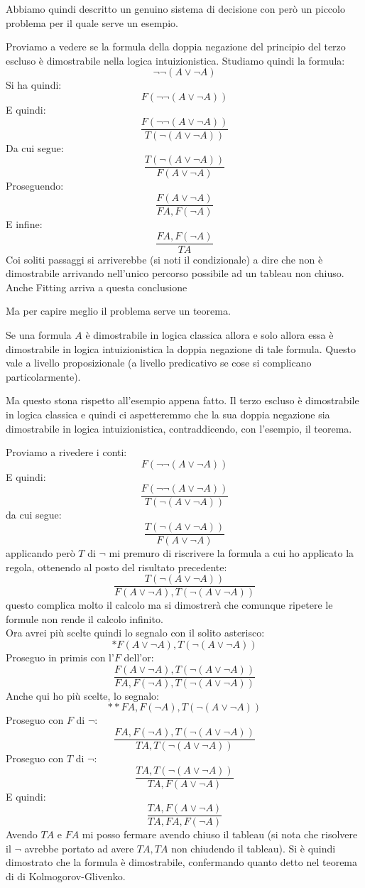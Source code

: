 \documentclass[a4paper,12pt, oneside]{book}
\begin{document}
Abbiamo quindi descritto un genuino sistema di decisione con però un piccolo
problema per il quale serve un esempio. 
\begin{esempio}
  Proviamo a vedere se la formula della doppia negazione del principio del terzo
  escluso è dimostrabile nella logica intuizionistica. Studiamo quindi la
  formula: 
  \[\neg\neg(A\lor \neg A)\]
  Si ha quindi:
  \[F(\neg\neg(A\lor \neg A))\]
  E quindi:
  \[\frac{F(\neg\neg(A\lor \neg A))}{T(\neg (A\lor \neg A))}\]
  Da cui segue:
  \[\frac{T(\neg (A\lor \neg A))}{F(A\lor \neg A)}\]
  Proseguendo:
  \[\frac{F(A\lor \neg A)}{FA, F(\neg A)}\]
  E infine:
  \[\frac{FA, F(\neg A)}{TA}\]
  Coi soliti passaggi si arriverebbe (si noti il condizionale) a dire che non è
  dimostrabile arrivando nell'unico percorso possibile ad un tableau non
  chiuso. \\
  Anche Fitting arriva a questa conclusione
\end{esempio}
Ma per capire meglio il problema serve un teorema.
\begin{teorema}
  Se una formula $A$ è dimostrabile in logica classica allora e solo allora essa
  è dimostrabile in logica intuizionistica la doppia negazione di tale
  formula. Questo vale a livello proposizionale (a livello predicativo se cose si
  complicano particolarmente). 
\end{teorema}
Ma questo stona rispetto all'esempio appena fatto. Il terzo escluso è
dimostrabile in logica classica e quindi ci aspetteremmo che la sua doppia
negazione sia dimostrabile in logica intuizionistica, contraddicendo, con
l'esempio, il teorema.
\begin{esempio}
  Proviamo a rivedere i conti:
  \[F(\neg\neg(A\lor \neg A))\]
  E quindi:
  \[\frac{F(\neg\neg(A\lor \neg A))}{T(\neg (A\lor \neg A))}\]
  da cui segue:
  \[\frac{T(\neg (A\lor \neg A))}{F(A\lor \neg A)}\]
  applicando però $T$ di $\neg$ mi premuro di riscrivere la formula a cui ho
  applicato la regola, ottenendo al posto del risultato precedente:
  \[\frac{T(\neg (A\lor \neg A))}{F(A\lor \neg A), T(\neg (A\lor \neg A))}\]
  questo complica molto il calcolo ma si dimostrerà che comunque ripetere le
  formule non rende il calcolo infinito.\\
  Ora avrei più scelte quindi lo segnalo con il solito asterisco:
  \[*F(A\lor \neg A), T(\neg (A\lor \neg A))\]
  Proseguo in primis con l'$F$ dell'or:
  \[\frac{F(A\lor \neg A), T(\neg (A\lor \neg A))}{FA, F(\neg A), T(\neg (A\lor
      \neg A))}\]
  Anche qui ho più scelte, lo segnalo:
  \[**FA, F(\neg A), T(\neg (A\lor\neg A))\]
  Proseguo con $F$ di $\neg$:
  \[\frac{FA, F(\neg A), T(\neg (A\lor\neg A))}{TA, T(\neg (A\lor\neg A))}\]
  Proseguo con $T$ di $\neg$:
  \[\frac{TA, T(\neg (A\lor\neg A))}{TA, F(A\lor\neg A)}\]
  E quindi:
  \[\frac{TA, F(A\lor\neg A)}{TA, FA, F(\neg A)}\]
  Avendo $TA$ e $FA$ mi posso fermare avendo chiuso il tableau (si nota che
  risolvere il $\neg$ avrebbe portato ad avere $TA,TA$ non chiudendo il
  tableau). Si è quindi dimostrato che la formula è dimostrabile, confermando
  quanto detto nel teorema di di Kolmogorov-Glivenko.
\end{esempio}
\end{document}
